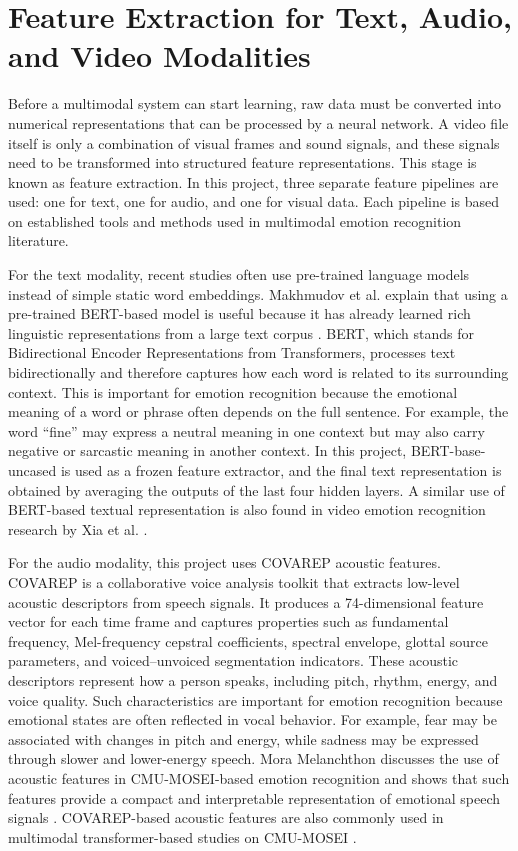 \section{Feature Extraction for Text, Audio, and Video Modalities}

Before a multimodal system can start learning, raw data must be converted into numerical representations that can be processed by a neural network. A video file itself is only a combination of visual frames and sound signals, and these signals need to be transformed into structured feature representations. This stage is known as feature extraction. In this project, three separate feature pipelines are used: one for text, one for audio, and one for visual data. Each pipeline is based on established tools and methods used in multimodal emotion recognition literature.

For the text modality, recent studies often use pre-trained language models instead of simple static word embeddings. Makhmudov et al. explain that using a pre-trained BERT-based model is useful because it has already learned rich linguistic representations from a large text corpus \cite{makhmudov2024enhancing}. BERT, which stands for Bidirectional Encoder Representations from Transformers, processes text bidirectionally and therefore captures how each word is related to its surrounding context. This is important for emotion recognition because the emotional meaning of a word or phrase often depends on the full sentence. For example, the word ``fine'' may express a neutral meaning in one context but may also carry negative or sarcastic meaning in another context. In this project, BERT-base-uncased is used as a frozen feature extractor, and the final text representation is obtained by averaging the outputs of the last four hidden layers. A similar use of BERT-based textual representation is also found in video emotion recognition research by Xia et al. \cite{xia2022multimodal}.

For the audio modality, this project uses COVAREP acoustic features. COVAREP is a collaborative voice analysis toolkit that extracts low-level acoustic descriptors from speech signals. It produces a 74-dimensional feature vector for each time frame and captures properties such as fundamental frequency, Mel-frequency cepstral coefficients, spectral envelope, glottal source parameters, and voiced--unvoiced segmentation indicators. These acoustic descriptors represent how a person speaks, including pitch, rhythm, energy, and voice quality. Such characteristics are important for emotion recognition because emotional states are often reflected in vocal behavior. For example, fear may be associated with changes in pitch and energy, while sadness may be expressed through slower and lower-energy speech. Mora Melanchthon discusses the use of acoustic features in CMU-MOSEI-based emotion recognition and shows that such features provide a compact and interpretable representation of emotional speech signals \cite{mora2021unimodal}. COVAREP-based acoustic features are also commonly used in multimodal transformer-based studies on CMU-MOSEI \cite{tsai2019multimodal}.

